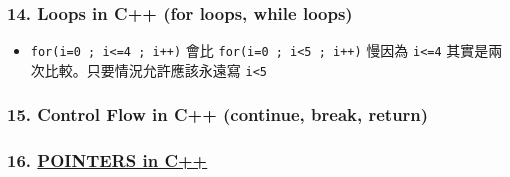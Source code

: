 \documentclass[11pt]{article}
\providecommand{\tightlist}{%
      \setlength{\itemsep}{0pt}\setlength{\parskip}{0pt}}
\begin{document}
\hypertarget{loops-in-c-for-loops-while-loops}{%
\subsubsection{14. Loops in C++ (for loops, while
loops)}\label{loops-in-c-for-loops-while-loops}}

\begin{itemize}
\tightlist
\item
  \texttt{for(i=0\ ;\ i\textless{}=4\ ;\ i++)} 會比
  \texttt{for(i=0\ ;\ i\textless{}5\ ;\ i++)} 慢因為
  \texttt{i\textless{}=4} 其實是兩次比較。只要情況允許應該永遠寫
  \texttt{i\textless{}5}
\end{itemize}

\hypertarget{control-flow-in-c-continue-break-return}{%
\subsubsection{15. Control Flow in C++ (continue, break,
return)}\label{control-flow-in-c-continue-break-return}}

\hypertarget{pointers-in-c}{%
\subsubsection{\texorpdfstring{16.
\href{https://www.youtube.com/watch?v=DTxHyVn0ODg\&list=PLlrATfBNZ98dudnM48yfGUldqGD0S4FFb\&index=16}{POINTERS
in C++}}{16. POINTERS in C++}}\label{pointers-in-c}}
\end{document}
